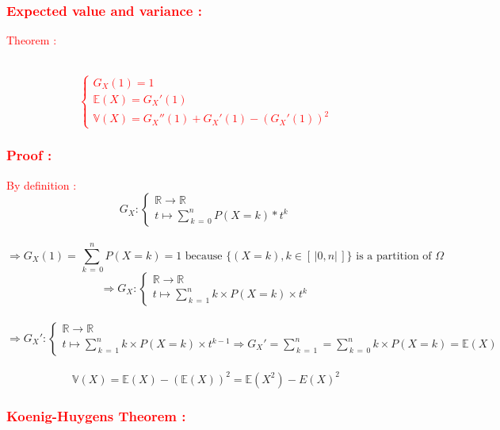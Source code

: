 \documentclass[a4paper,12pt]{article}
\begin{document}
\textcolor{red}{\subsubsection*{Expected value and variance :}}\bigskip

\textcolor{red}{Theorem :} \bigskip

 \\

\textcolor{red}{\[
\begin{cases}
    G_X(1) = 1 \\
    \mathbb{E}(X) = G_X'(1)\\
    \mathbb{V}(X) = G_X''(1) + G_X'(1) - (G_X'(1))^2
\end{cases}
\]}
\bigskip
\textcolor{red}{\subsubsection*{Proof :}}\bigskip

\textcolor{red}{By definition :} \\
\[
  G_X : \begin{cases}
    \mathbb{R} \rightarrow \mathbb{R}\\
 t \mapsto \sum_{ \,k \, = \,0}^{n}{P(X = k) * t^k}
\end{cases}
\]\\
\[
\Rightarrow G_X(1) = \sum_{\,k \,= \,0}^{n}{P(X = k) = 1} \text{  because } \{(X = k), k\in  \left[\,|0, n|\,\right]\} \text{ is a partition of } \Omega
\]
\[
\Rightarrow G_X : \begin{cases}
    \mathbb{R} \rightarrow \mathbb{R} \\
    t \mapsto \sum_{\,k\,=\,1}^{n}{k \times P(X = k) \times t^{k}} 
\end{cases} 
\]\\
\[
\Rightarrow G_X' : \begin{cases}
    \mathbb{R} \rightarrow \mathbb{R} \\
    t \mapsto \sum_{\,k\,=\, 1}^{n}{k \times P(X  = k) \times t^{k-1}} \Rightarrow G_X' = \sum_{\,k\,=\, 1}^{n}
     = \sum_{\,k\,=\, 0}^{n}{k \times P(X  = k)} = \mathbb{E}(X)
\end{cases}
\]\\
\[
\mathbb{V}(X) = \mathbb{E}(X)-(\mathbb{E}(X))^2 = \mathbb{E}(X^2) - E(X)^2
\]
\bigskip
\textcolor{red}{\subsubsection*{Koenig-Huygens Theorem :}}\bigskip
\end{document}
